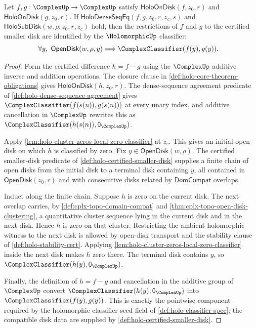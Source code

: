 \begin{theorem}
\label{thm:holo-dense-sequence-identity-classifier}
Let $f,g:\ComplexUp\to\ComplexUp$ satisfy $\mathsf{HoloOnDisk}(f,z_0,r)$ and $\mathsf{HoloOnDisk}(g,z_0,r)$. If $\mathsf{HoloDenseSeqEq}(f,g,z_0,r,z_c,s)$ and $\mathsf{HoloSubDisk}(w,\rho;z_0,r,z_c)$ hold, then the restrictions of $f$ and $g$ to the certified smaller disk are identified by the $\HolomorphicUp$ classifier:
$$
\forall y,\ \mathsf{OpenDisk}(w,\rho,y)\Longrightarrow \ComplexClassifier(f(y),g(y)).
$$
\end{theorem}
\begin{proof}
Form the certified difference $h=f-g$ using the $\ComplexUp$ additive inverse and addition operations. The closure clause in \autoref{def:holo-core-theorem-obligations} gives $\mathsf{HoloOnDisk}(h,z_0,r)$. The dense-sequence agreement predicate of \autoref{def:holo-dense-sequence-agreement} gives $\ComplexClassifier(f(s(n)),g(s(n)))$ at every unary index, and additive cancellation in $\ComplexUp$ rewrites this as $\ComplexClassifier(h(s(n)),\mathsf{0}_{\ComplexUp})$.

Apply \autoref{lem:holo-cluster-zeros-local-zero-classifier} at $z_c$. This gives an initial open disk on which $h$ is classified by zero. Fix $y\in\mathsf{OpenDisk}(w,\rho)$. The certified smaller-disk predicate of \autoref{def:holo-certified-smaller-disk} supplies a finite chain of open disks from the initial disk to a terminal disk containing $y$, all contained in $\mathsf{OpenDisk}(z_0,r)$ and with consecutive disks related by $\mathsf{DomCompat}$ overlaps.

Induct along the finite chain. Suppose $h$ is zero on the current disk. The next overlap carries, by \autoref{def:cplx-topo-domain-compat} and \autoref{thm:cplx-topo-open-disk-clustering}, a quantitative cluster sequence lying in the current disk and in the next disk. Hence $h$ is zero on that cluster. Restricting the ambient holomorphic witness to the next disk is allowed by open-disk transport and the stability clause of \autoref{def:holo-stability-cert}. Applying \autoref{lem:holo-cluster-zeros-local-zero-classifier} inside the next disk makes $h$ zero there. The terminal disk contains $y$, so $\ComplexClassifier(h(y),\mathsf{0}_{\ComplexUp})$.

Finally, the definition of $h=f-g$ and cancellation in the additive group of $\ComplexUp$ convert $\ComplexClassifier(h(y),\mathsf{0}_{\ComplexUp})$ into $\ComplexClassifier(f(y),g(y))$. This is exactly the pointwise component required by the holomorphic classifier seed field of \autoref{def:holo-classifier-spec}; the compatible disk data are supplied by \autoref{def:holo-certified-smaller-disk}.
\end{proof}

